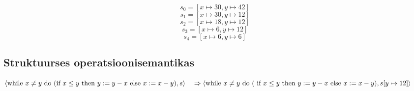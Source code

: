 \documentclass[a4paper,oneside,draft]{article}
\begin{document}
\[s_0 = [x \mapsto 30, y \mapsto 42]\]
\[s_1 = [x \mapsto 30, y \mapsto 12]\]
\[s_2 = [x \mapsto 18, y \mapsto 12]\]
\[s_3 = [x \mapsto 6, y \mapsto 12]\]
\[s_4 = [x \mapsto 6, y \mapsto 6]\]

\subsection{Struktuurses operatsioonisemantikas}

\(
  \langle
  \text{while } x \neq y \text{ do }
  (\text{if } x \leq y
    \text{ then } y := y-x
    \text{ else } x:= x-y), s
  \rangle
  \\
  \quad \Rightarrow
  \langle
  \text{while } x \neq y \text{ do }
  (\text{ if } x \leq y
    \text{ then } y := y-x
    \text{ else } x:= x-y),
    s[y \mapsto 12]
  \rangle
\)
\end{document}
